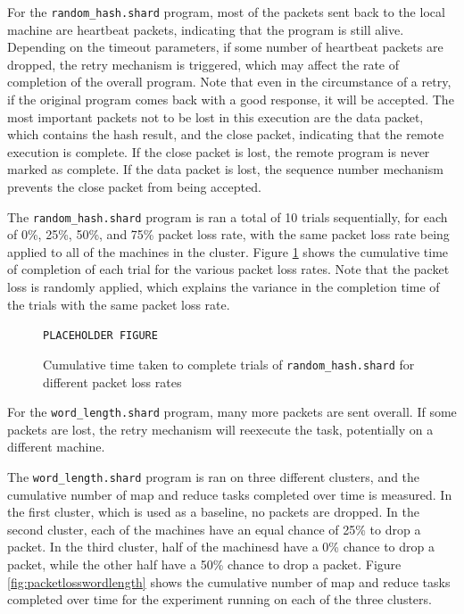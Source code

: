 \documentclass[twoside]{report}
\newcommand{\todoi}[1]{\todo[inline, color=blue!20]{TODO: {#1}}}
\begin{document}
For the \texttt{random\_hash.shard} program, most of the packets sent back to the local machine are heartbeat packets, indicating that the program is still alive.
Depending on the timeout parameters, if some number of heartbeat packets are dropped, the retry mechanism is triggered, which may affect the rate of completion of the overall program.
Note that even in the circumstance of a retry, if the original program comes back with a good response, it will be accepted.
The most important packets not to be lost in this execution are the data packet, which contains the hash result, and the close packet, indicating that the remote execution is complete.
If the close packet is lost, the remote program is never marked as complete.
If the data packet is lost, the sequence number mechanism prevents the close packet from being accepted.

The \texttt{random\_hash.shard} program is ran a total of 10 trials sequentially, for each of 0\%, 25\%, 50\%, and 75\% packet loss rate, with the same packet loss rate being applied to all of the machines in the cluster.
Figure \ref{fig:packetlosshash} shows the cumulative time of completion of each trial for the various packet loss rates.
Note that the packet loss is randomly applied, which explains the variance in the completion time of the trials with the same packet loss rate.

\begin{figure}[h]
  \begin{center}
    \vspace{2cm}
    \texttt{PLACEHOLDER FIGURE}
    \vspace{2cm}
    \caption{Cumulative time taken to complete trials of \texttt{random\_hash.shard} for different packet loss rates}
    \label{fig:packetlosshash}
  \end{center}
\end{figure}
\todoi{Analyze the results of what this graph looks like}

For the \texttt{word\_length.shard} program, many more packets are sent overall.
If some packets are lost, the retry mechanism will reexecute the task, potentially on a different machine.

The \texttt{word\_length.shard} program is ran on three different clusters, and the cumulative number of map and reduce tasks completed over time is measured.
In the first cluster, which is used as a baseline, no packets are dropped.
In the second cluster, each of the machines have an equal chance of 25\% to drop a packet.
In the third cluster, half of the machinesd have a 0\% chance to drop a packet, while the other half have a 50\% chance to drop a packet.
Figure \ref{fig:packetlosswordlength} shows the cumulative number of map and reduce tasks completed over time for the experiment running on each of the three clusters.
\end{document}
